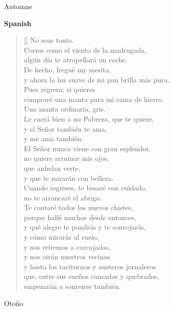 \documentclass[a4paper,12pt,twoside,final]{book}
\begin{document}
Automne

\newpage


\noindent \textbf{Spanish}


\settowidth{\versewidth}{y ahora la luz suave de mi pan brilla más pura.}

\begin{verse}[\versewidth]
  No seas tonta. \\
  Corres como el viento de la madrugada, \\
  algún día te atropellará un coche. \\
  De hecho, fregué my mesita, \\
  y ahora la luz suave de mi pan brilla más pura. \\
  Pues regresa; si quieres \\
  compraré una manta para mi cama de hierro. \\
  Una manta ordinaria, gris. \\
  Le caerá bien a mi Pobreza, que te quiere, \\
  y el Señor también te ama, \\
  y me ama también. \\
  El Señor nunca viene con gran esplendor, \\
  no quiere arruinar mis ojos, \\
  que anhelan verte, \\
  y que te mirarán con belleza. \\
  Cuando regreses, te besaré con cuidado, \\
  no te arrancaré el abrigo. \\
  Te contaré todos los nuevos chistes, \\
  porque hallé muchos desde entonces, \\
  y qué alegre te pondrás y te sonrojarás, \\
  y cómo mirarás al suelo, \\
  y nos reiremos a carcajadas, \\
  y nos oirán nuestros vecinos \\
  y hasta los taciturnos y austeros jornaleros \\
  que, entre sus sueños cansados y quebrados, \\
  empezarán a sonreirse también. \\
\end{verse}

Otoño
\end{document}
